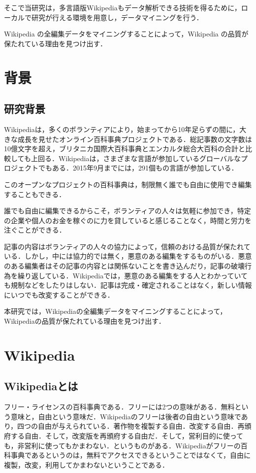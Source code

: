 そこで当研究は，多言語版Wikipediaもデータ解析できる技術を得るために，ローカルで研究が行える環境を用意し，データマイニングを行う．

Wikipedia の全編集データをマイニングすることによって，Wikipedia の品質が保たれている理由を見つけ出す．



\chapter{背景}

\section{研究背景}
Wikipediaは，多くのボランティアにより，始まってから10年足らずの間に，大きな成長を見せたオンライン百科事典プロジェクトである．総記事数の文字数は10億文字を超え，ブリタニカ国際大百科事典とエンカルタ総合大百科の合計と比較しても上回る．Wikipediaは，さまざまな言語が参加しているグローバルなプロジェクトでもある．2015年9月までには，291個もの言語が参加している．

このオープンなプロジェクトの百科事典は，制限無く誰でも自由に使用でき編集することもできる．

誰でも自由に編集できるからこそ，ボランティアの人々は気軽に参加でき，特定の企業や個人のお金を稼ぐのに力を貸していると感じることなく，時間と労力を注ぐことができる．

記事の内容はボランティアの人々の協力によって，信頼のおける品質が保たれている．しかし，中には協力的では無く，悪意のある編集をするものがいる．悪意のある編集者はその記事の内容とは関係ないことを書き込んだり，記事の破壊行為を繰り返している．Wikipediaでは，悪意のある編集をする人とわかっていても規制などをしたりはしない．記事は完成・確定されることはなく，新しい情報にいつでも改変することができる．

本研究では，Wikipediaの全編集データをマイニングすることによって，Wikipediaの品質が保たれている理由を見つけ出す．


\chapter{Wikipedia}

\section{Wikipediaとは}

フリー・ライセンスの百科事典である．フリーには2つの意味がある．無料という意味と，自由という意味だ．Wikipediaのフリーは後者の自由という意味であり，四つの自由が与えられている．著作物を複製する自由．改変する自由．再頒府する自由．そして，改変版を再頒府する自由だ．そして，営利目的に使っても，非営利に使ってもかまわない．というものがある．Wikipediaがフリーの百科事典であるというのは，無料でアクセスできるということではなくて，自由に複製，改変，利用してかまわないということである．

